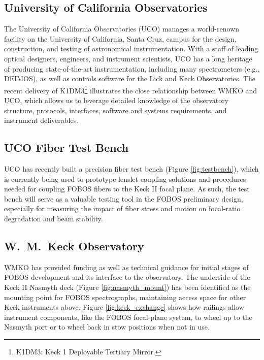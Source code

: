 \documentclass[oneside,11pt]{amsart}
\begin{document}
\subsection*{University of California Observatories}

The University of California Observatories (UCO) manages a world-renown
facility on the University of California, Santa Cruz, campus for the
design, construction, and testing of astronomical instrumentation.  With
a staff of leading optical designers, engineers, and instrument
scientists, UCO has a long heritage of producing state-of-the-art
instrumentation, including many spectrometers (e.g., DEIMOS), as well as
controls software for the Lick and Keck Observatories.  The recent
delivery of K1DM3\footnote{K1DM3: Keck 1 Deployable Tertiary Mirror.}
illustrates the close relationship between WMKO and UCO, which allows us
to leverage detailed knowledge of the observatory structure, protocols,
interfaces, software and systems requirements, and instrument
deliverables.

\subsection*{UCO Fiber Test Bench}

UCO has recently built a precision fiber test bench (Figure
\ref{fig:testbench}), which is currently being used to prototype lenslet
coupling solutions and procedures needed for coupling FOBOS fibers to
the Keck II focal plane.  As such, the test bench will serve as a
valuable testing tool in the FOBOS preliminary design, especially for
measuring the impact of fiber stress and motion on focal-ratio
degradation and beam stability.

\subsection*{W.~M.~Keck Observatory}

WMKO has provided funding as well as technical guidance for initial
stages of FOBOS development and its interface to the observatory.  The
underside of the Keck II Nasmyth deck (Figure \ref{fig:nasmyth_mount})
has been identified as the mounting point for FOBOS spectrographs,
maintaining access space for other Keck instruments above.  Figure
\ref{fig:keck_exchange} shows how railings allow instrument components,
like the FOBOS focal-plane system, to wheel up to the Nasmyth port or to
wheel back in stow positions when not in use.
\end{document}
